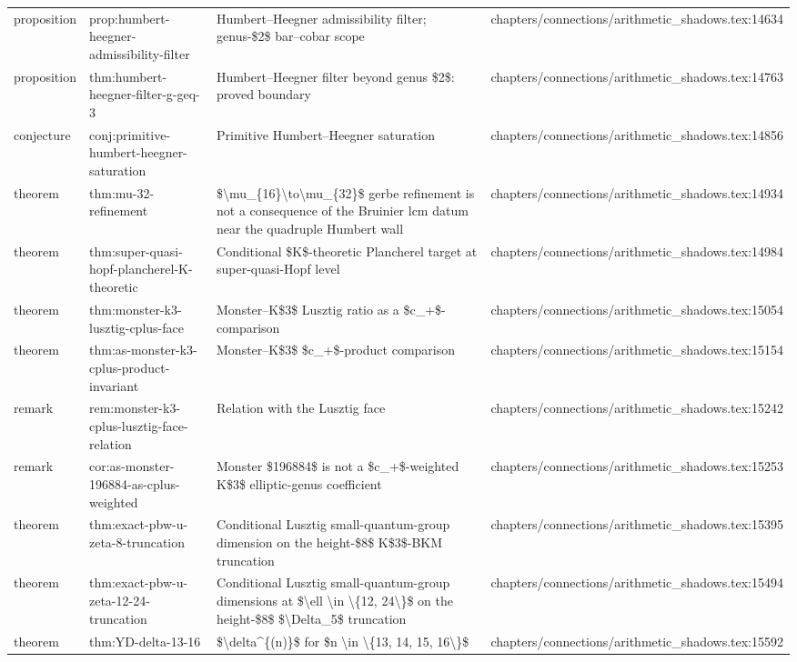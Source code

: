 \documentclass[11pt]{article}
\begin{document}
\begin{longtable}{L{0.10\textwidth}L{0.26\textwidth}L{0.42\textwidth}L{0.22\textwidth}}
proposition & prop:humbert-heegner-admissibility-filter & Humbert--Heegner admissibility filter; genus-\$2\$ bar--cobar scope & chapters/connections/arithmetic\_shadows.tex:14634\\
proposition & thm:humbert-heegner-filter-g-geq-3 & Humbert--Heegner filter beyond genus \$2\$: proved boundary & chapters/connections/arithmetic\_shadows.tex:14763\\
conjecture & conj:primitive-humbert-heegner-saturation & Primitive Humbert--Heegner saturation & chapters/connections/arithmetic\_shadows.tex:14856\\
theorem & thm:mu-32-refinement & \$\textbackslash{}mu\_\{16\}\textbackslash{}to\textbackslash{}mu\_\{32\}\$ gerbe refinement is not a consequence of the Bruinier lcm datum near the quadruple Humbert wall & chapters/connections/arithmetic\_shadows.tex:14934\\
theorem & thm:super-quasi-hopf-plancherel-K-theoretic & Cond{}itional \$K\$-theoretic Plancherel target at super-quasi-Hopf level & chapters/connections/arithmetic\_shadows.tex:14984\\
theorem & thm:monster-k3-lusztig-cplus-face & Monster--K\$3\$ Lusztig ratio as a \$c\_+\$-comparison & chapters/connections/arithmetic\_shadows.tex:15054\\
theorem & thm:as-monster-k3-cplus-product-invariant & Monster--K\$3\$ \$c\_+\$-product comparison & chapters/connections/arithmetic\_shadows.tex:15154\\
remark & rem:monster-k3-cplus-lusztig-face-relation & Relation with the Lusztig face & chapters/connections/arithmetic\_shadows.tex:15242\\
remark & cor:as-monster-196884-as-cplus-weighted & Monster \$196884\$ is not a \$c\_+\$-weighted K\$3\$ elliptic-genus coefficient & chapters/connections/arithmetic\_shadows.tex:15253\\
theorem & thm:exact-pbw-u-zeta-8-truncation & Cond{}itional Lusztig small-quantum-group dimension on the height-\$8\$ K\$3\$-BKM truncation & chapters/connections/arithmetic\_shadows.tex:15395\\
theorem & thm:exact-pbw-u-zeta-12-24-truncation & Cond{}itional Lusztig small-quantum-group dimensions at \$\textbackslash{}ell \textbackslash{}in \textbackslash{}\{12, 24\textbackslash{}\}\$ on the height-\$8\$ \$\textbackslash{}Delta\_5\$ truncation & chapters/connections/arithmetic\_shadows.tex:15494\\
theorem & thm:YD-delta-13-16 & \$\textbackslash{}delta\textasciicircum{}\{(n)\}\$ for \$n \textbackslash{}in \textbackslash{}\{13, 14, 15, 16\textbackslash{}\}\$ & chapters/connections/arithmetic\_shadows.tex:15592\\

\end{longtable}
\end{document}
